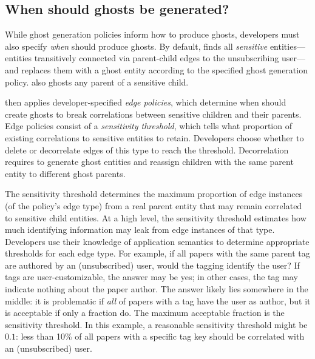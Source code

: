 \subsection{When should ghosts be generated?}
\label{design:edgepol}
While ghost generation policies inform \sys how to produce ghosts, developers must also specify
\emph{when} \sys should produce ghosts. 
By default, \sys finds all \emph{sensitive} entities---entities transitively connected via
parent-child edges to the unsubscribing user---and
replaces them with a ghost entity according to the specified ghost generation policy. \sys also
ghosts any parent of a sensitive child.

\sys then applies developer-specified \emph{edge policies}, which determine when \sys should
create ghosts to break correlations between sensitive children and their parents.
Edge policies consist of a \emph{sensitivity threshold}, which tells \sys what
proportion of existing correlations to sensitive entities to retain. Developers choose
whether to delete or decorrelate edges of this type to reach the threshold. Decorrelation requires
\sys to generate ghost entities and reassign children with the same parent entity to different
ghost parents.

%
The sensitivity threshold determines the maximum proportion of edge instances (of the policy's edge
type) from a real parent entity that may remain correlated to sensitive child entities.
At a high level, the sensitivity threshold estimates how much identifying information may leak from
edge instances of that type.  Developers use their knowledge of application semantics to determine
appropriate thresholds for each edge type. 
For example, if all papers with the same parent tag are authored by an (unsubscribed) user, would
the tagging identify the user? If tags are user-customizable, the answer may be yes; in other cases, the tag
may indicate nothing about the paper author. The answer likely lies somewhere in the middle: it is
problematic if \emph{all} of papers with a tag have the user as author, but it is acceptable if only
a fraction do.  The maximum acceptable fraction is the sensitivity threshold. In this example, a
reasonable sensitivity threshold might be $0.1$: less than 10\% of all papers with a specific tag
key should be correlated with an (unsubscribed) user. 

